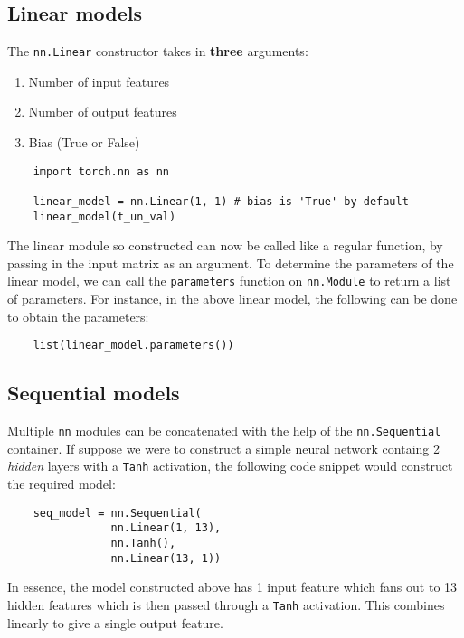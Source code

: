 \documentclass[11pt]{article}
\begin{document}
\subsection{Linear models}
\label{sec:org78da1fd}
The \texttt{nn.Linear} constructor takes in \textbf{three} arguments:
\begin{enumerate}
\item Number of input features
\item Number of output features
\item Bias (True or False)
\end{enumerate}
\begin{verbatim}
    import torch.nn as nn

    linear_model = nn.Linear(1, 1) # bias is 'True' by default
    linear_model(t_un_val)
\end{verbatim}
The linear module so constructed can now be called like a regular function, by passing in the input matrix as an argument. To determine the parameters of the linear model, we can call the \texttt{parameters} function on \texttt{nn.Module} to return a list of parameters. For instance, in the above linear model, the following can be done to obtain the parameters:
\begin{verbatim}
    list(linear_model.parameters())
\end{verbatim}

\subsection{Sequential models}
\label{sec:org8b7e703}
Multiple \texttt{nn} modules can be concatenated with the help of the \texttt{nn.Sequential} container. If suppose we were to construct a simple neural network containg 2 \emph{hidden} layers with a \texttt{Tanh} activation, the following code snippet would construct the required model:
\begin{verbatim}
    seq_model = nn.Sequential(
                nn.Linear(1, 13),
                nn.Tanh(),
                nn.Linear(13, 1))
\end{verbatim}
In essence, the model constructed above has 1 input feature which fans out to 13 hidden features which is then passed through a \texttt{Tanh} activation. This combines linearly to give a single output feature.
\end{document}
